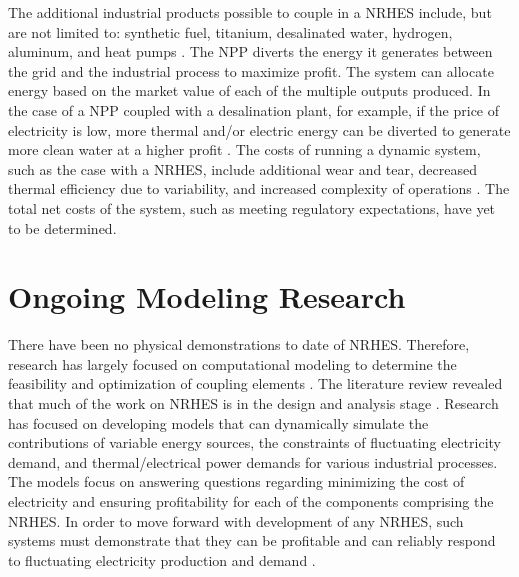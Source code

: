 \documentclass[12pt]{UIdahoMastersThesis}
\begin{document}
The additional industrial products possible to couple in a NRHES include, but are not limited to: synthetic fuel, titanium, desalinated water, hydrogen, aluminum, and heat pumps \cite{Bienvenue2015}. The NPP diverts the energy it generates between the grid and the industrial process to maximize profit. The system can allocate energy based on the market value of each of the multiple outputs produced. In the case of a NPP coupled with a desalination plant, for example, if the price of electricity is low, more thermal and/or electric energy can be diverted to generate more clean water at a higher profit \cite {Chen2016}. The costs of running a dynamic system, such as the case with a NRHES, include additional wear and tear, decreased thermal efficiency  due to variability, and increased complexity of operations  \cite{Garcia2013}. The total net costs of the system, such as meeting regulatory expectations, have yet to be determined. 

\section{Ongoing Modeling Research}
There have been no physical demonstrations to date of NRHES. Therefore, research has largely focused on computational modeling to determine the feasibility and optimization of coupling elements \cite{Rabiti2015, Boardman2013, Shropshire2012}. The literature review revealed that much of the work on NRHES is in the design and analysis stage \cite{Epiney2016, Boardman2013, Shropshire2012}. Research has focused on developing models that can dynamically simulate the contributions of variable energy sources, the constraints of fluctuating electricity demand, and thermal/electrical power demands for various industrial processes. The models focus on answering questions regarding minimizing the cost of electricity and ensuring profitability for each of the components comprising the NRHES. In order to move forward with development of any NRHES, such systems must demonstrate that they can be profitable and can reliably respond to fluctuating electricity production and demand \cite{Rabiti2015}. 
\end{document}
